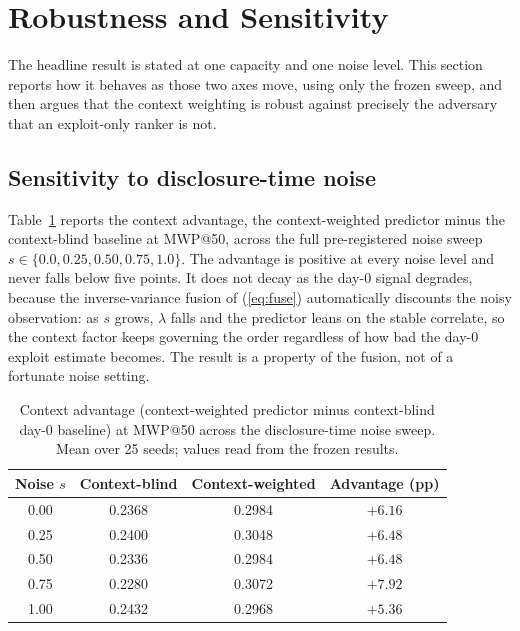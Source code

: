 \documentclass[journal]{IEEEtran}
\begin{document}
\section{Robustness and Sensitivity}
The headline result is stated at one capacity and one noise level. This section reports how it
behaves as those two axes move, using only the frozen sweep, and then argues that the context
weighting is robust against precisely the adversary that an exploit-only ranker is not.

\subsection{Sensitivity to disclosure-time noise}
Table~\ref{tab:noise} reports the context advantage, the context-weighted predictor minus the
context-blind baseline at MWP@50, across the full pre-registered noise sweep
$s \in \{0.0, 0.25, 0.50, 0.75, 1.0\}$. The advantage is positive at every noise level and never
falls below five points. It does not decay as the day-0 signal degrades, because the
inverse-variance fusion of (\ref{eq:fuse}) automatically discounts the noisy observation: as $s$
grows, $\lambda$ falls and the predictor leans on the stable correlate, so the context factor keeps
governing the order regardless of how bad the day-0 exploit estimate becomes. The result is a
property of the fusion, not of a fortunate noise setting.

\begin{table}[t]
\centering
\caption{Context advantage (context-weighted predictor minus context-blind day-0 baseline) at
MWP@50 across the disclosure-time noise sweep. Mean over 25 seeds; values read from the frozen
results.}
\label{tab:noise}
\footnotesize
\begin{tabular}{@{}cccc@{}}
\toprule
Noise $s$ & Context-blind & Context-weighted & Advantage (pp) \\
\midrule
0.00 & 0.2368 & 0.2984 & $+6.16$ \\
0.25 & 0.2400 & 0.3048 & $+6.48$ \\
0.50 & 0.2336 & 0.2984 & $+6.48$ \\
0.75 & 0.2280 & 0.3072 & $+7.92$ \\
1.00 & 0.2432 & 0.2968 & $+5.36$ \\
\bottomrule
\end{tabular}
\end{table}
\end{document}
